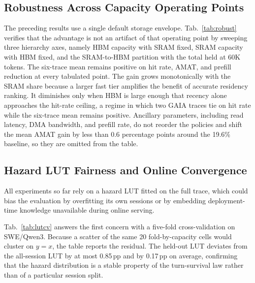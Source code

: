 \subsection{Robustness Across Capacity Operating Points}
\label{sec:sw-robust}

The preceding results use a single default storage envelope.
Tab.~\ref{tab:robust} verifies that the advantage is not an artifact of
that operating point by sweeping three hierarchy axes, namely HBM capacity
with SRAM fixed, SRAM capacity with HBM fixed, and the SRAM-to-HBM
partition with the total held at 60K tokens. The six-trace mean remains
positive on hit rate, AMAT, and prefill reduction at every tabulated
point. The gain grows monotonically with the SRAM share because a
larger fast tier amplifies the benefit of accurate residency ranking.
It diminishes only when HBM is large enough that recency alone
approaches the hit-rate ceiling, a regime in which two GAIA traces tie
on hit rate while the six-trace mean remains positive. Ancillary
parameters, including read latency, DMA bandwidth, and prefill rate, do
not reorder the policies and shift the mean AMAT gain by less than 0.6
percentage points around the 19.6\% baseline, so they are omitted from
the table.



\subsection{Hazard LUT Fairness and Online Convergence}
\label{sec:sw-lut}

All experiments so far rely on a hazard LUT fitted on the full trace,
which could bias the evaluation by overfitting its own sessions or by
embedding deployment-time knowledge unavailable during online serving.

Tab.~\ref{tab:lutcv} answers the first concern with a five-fold
cross-validation on SWE/Qwen3. Because a scatter of the same 20
fold-by-capacity cells would cluster on $y{=}x$, the table reports the
residual. The held-out LUT deviates from the all-session LUT by at
most 0.85\,pp and by 0.17\,pp on average, confirming that the hazard
distribution is a stable property of the turn-survival law rather than
of a particular session split.

